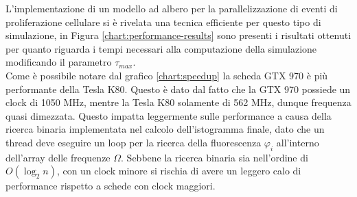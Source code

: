 L'implementazione di un modello ad albero per la parallelizzazione di eventi
di proliferazione cellulare si è rivelata una tecnica efficiente per questo
tipo di simulazione, in Figura \ref{chart:performance-results}
sono presenti i risultati ottenuti per
quanto riguarda i tempi necessari alla computazione della simulazione
modificando il parametro $\tau_{max}$.
\\
Come è possibile notare dal grafico \ref{chart:speedup} la scheda
GTX 970 è più performante della Tesla K80. Questo è dato dal fatto che
la GTX 970 possiede un clock di 1050 MHz, mentre la Tesla K80 solamente di
562 MHz, dunque frequenza quasi dimezzata. Questo impatta leggermente sulle
performance a causa della ricerca binaria implementata nel calcolo
dell'istogramma finale, dato che un thread deve eseguire un loop per la ricerca
della fluorescenza $\varphi_{i}$ all'interno dell'array delle frequenze $\Omega$.
Sebbene la ricerca binaria sia nell'ordine di $O(\log_{2}{n})$, con un clock
minore si rischia di avere un leggero calo di performance rispetto a schede
con clock maggiori.
